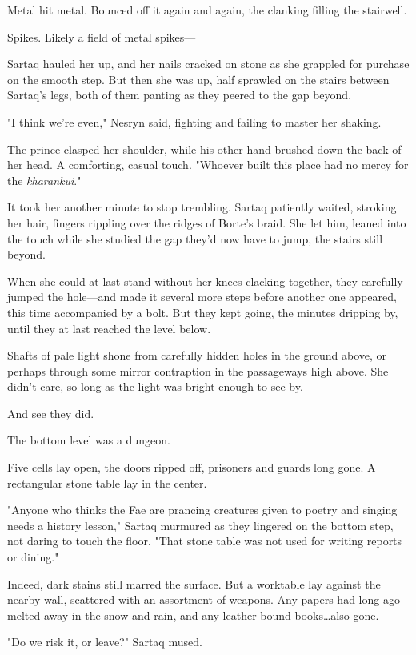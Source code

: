 Metal hit metal.
Bounced off it again and again, the clanking filling the stairwell.

Spikes.
Likely a field of metal spikes---

Sartaq hauled her up, and her nails cracked on stone as she grappled for purchase on the smooth step.
But then she was up, half sprawled on the stairs between Sartaq's legs, both of them panting as they peered to the gap beyond.

"I think we're even," Nesryn said, fighting and failing to master her shaking.

The prince clasped her shoulder, while his other hand brushed down the back of her head.
A comforting, casual touch.
"Whoever built this place had no mercy for the \emph{kharankui}."

It took her another minute to stop trembling.
Sartaq patiently waited, stroking her hair, fingers rippling over the ridges of Borte's braid.
She let him, leaned into the touch while she studied the gap they'd now have to jump, the stairs still beyond.

When she could at last stand without her knees clacking together, they carefully jumped the hole---and made it several more steps before another one appeared, this time accompanied by a bolt.
But they kept going, the minutes dripping by, until they at last reached the level below.

Shafts of pale light shone from carefully hidden holes in the ground above, or perhaps through some mirror contraption in the passageways high above.
She didn't care, so long as the light was bright enough to see by.

And see they did.

The bottom level was a dungeon.

Five cells lay open, the doors ripped off, prisoners and guards long gone.
A rectangular stone table lay in the center.

"Anyone who thinks the Fae are prancing creatures given to poetry and singing needs a history lesson," Sartaq murmured as they lingered on the bottom step, not daring to touch the floor.
"That stone table was not used for writing reports or dining."

Indeed, dark stains still marred the surface.
But a worktable lay against the nearby wall, scattered with an assortment of weapons.
Any papers had long ago melted away in the snow and rain, and any leather-bound books\ldots also gone.

"Do we risk it, or leave?"
Sartaq mused.

